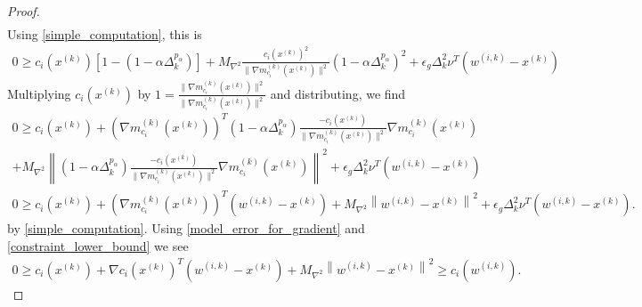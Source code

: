 \documentclass{article}
\theoremstyle{case}
\newcommand{\dk}{\Delta_k}
\newcommand{\gmcik}{{\nabla m_{c_i}^{(k)}\left(\xk\right)}}
\newcommand{\maxhessian}{{M_{\nabla^2}}}
\newcommand{\wik}{{w^{(i, k)}}}
\newcommand{\xk}{{x^{(k)}}}
\begin{document}
\begin{proof}
\begin{align*}
\end{align*}
Using \cref{simple_computation}, this is
\begin{align*}
0 \ge c_i(\xk)\left[1 - \left(1 - \alpha \dk^{p_{\alpha}}\right)\right] + \maxhessian \frac {c_i(\xk)^2}{\|\gmcik\|^2}\left(1 - \alpha \dk^{p_{\alpha}}\right)^2 + \epsilon_g \dk^2\nu^T \left(\wik - \xk\right)
\end{align*}
Multiplying $c_i(\xk)$ by $1 = \frac{\|\gmcik\|^2}{\|\gmcik\|^2}$ and distributing, we find
\begin{align*}
0 \ge c_i(\xk) + \left(\gmcik\right)^T\left(1 - \alpha \dk^{p_{\alpha}}\right)\frac{-c_i(\xk)}{\|\gmcik\|^2}\gmcik  \\
+ \maxhessian \left\|\left(1 - \alpha \dk^{p_{\alpha}}\right)\frac{-c_i(\xk)}{\|\gmcik\|^2}\gmcik\right\|^2
+ \epsilon_g \dk^2\nu^T \left(\wik - \xk\right) \\
0 \ge c_i(\xk) + \left(\gmcik\right)^T\left(\wik - \xk\right)+ \maxhessian \left\|\wik - \xk\right\|^2  + \epsilon_g \dk^2\nu^T \left(\wik - \xk\right).
\end{align*}
by \cref{simple_computation}.
Using \cref{model_error_for_gradient} and \cref{constraint_lower_bound} we see
\begin{align}
0 \ge c_i(\xk) + \nabla c_i(\xk)^T\left(\wik - \xk \right) + \maxhessian \left\|\wik - \xk\right\|^2 \ge c_i(\wik). \label{c_is_negative}
\end{align}


\end{proof}
\end{document}
